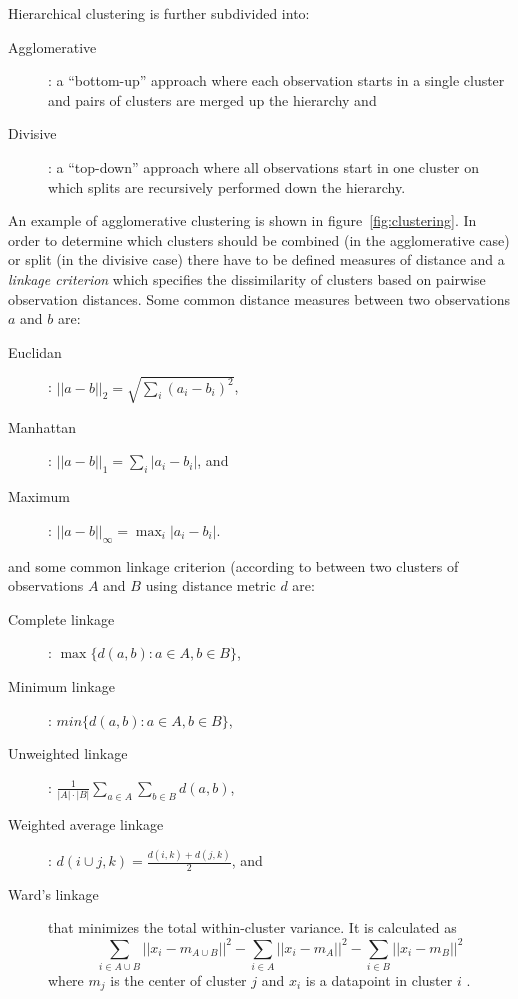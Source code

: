 Hierarchical clustering is further subdivided into:
\begin{description}
	\item[Agglomerative]: a ``bottom-up'' approach where each observation
		starts in a single cluster and pairs of clusters are merged up the hierarchy and
	\item[Divisive]: a ``top-down'' approach where all observations start in one cluster on which
		splits are recursively performed down the hierarchy.
\end{description}
An example of agglomerative clustering is shown in figure~\ref{fig:clustering}. 
In order to determine which clusters should be combined (in the agglomerative case) or 
split (in the divisive case) there have to be defined measures of distance and a \textit{linkage 
criterion} which specifies the dissimilarity of clusters based on pairwise observation 
distances. Some common distance measures between two observations $a$ and $b$ are:
\begin{description}
	\item[Euclidan]: $||a - b||_2 = \sqrt{\sum_i (a_i - b_i)^2}$, 
	\item[Manhattan]: $||a - b||_1 = \sum_i |a_i - b_i|$, and
	\item[Maximum]: $||a - b||_{\infty} = \max_i |a_i - b_i|$.
\end{description}
and some common linkage criterion (according to \citep{szekely2005hierarchical}
between two clusters of observations $A$ and $B$ 
using distance metric $d$ are:
\begin{description}
	\item[Complete linkage]: $\max \{d(a, b): a \in A, b \in B\}$,
	\item[Minimum linkage]: $min \{d(a, b): a \in A, b \in B\}$,
	\item[Unweighted linkage]: $\frac{1}{|A| \cdot |B|} \sum_{a \in A} \sum_{b \in B} d(a, b)$,
	\item[Weighted average linkage]: $d(i \cup j, k) = \frac{d(i, k) + d(j, k)}{2}$, and
	\item[Ward's linkage] that minimizes the total within-cluster variance. It is calculated as
		$$
		\sum_{i \in A \cup B} ||x_i - m_{A \cup B}||^2 - \sum_{i \in A}||x_i - m_A||^2 
		- \sum_{i \in B} ||x_i - m_B||^2
		$$ 
		where $m_j$ is the center of cluster $j$  and $x_i$ is a datapoint
		in cluster $i$ \citep{ward1963hierarchical}.
\end{description}


